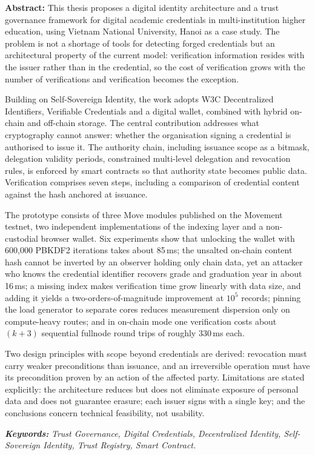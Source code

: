 
{
\textbf{Abstract:} This thesis proposes a digital identity architecture and a trust governance framework for digital academic credentials in multi-institution higher education, using Vietnam National University, Hanoi as a case study. The problem is not a shortage of tools for detecting forged credentials but an architectural property of the current model: verification information resides with the issuer rather than in the credential, so the cost of verification grows with the number of verifications and verification becomes the exception.

Building on Self-Sovereign Identity, the work adopts W3C Decentralized Identifiers, Verifiable Credentials and a digital wallet, combined with hybrid on-chain and off-chain storage. The central contribution addresses what cryptography cannot answer: whether the organisation signing a credential is authorised to issue it. The authority chain, including issuance scope as a bitmask, delegation validity periods, constrained multi-level delegation and revocation rules, is enforced by smart contracts so that authority state becomes public data. Verification comprises seven steps, including a comparison of credential content against the hash anchored at issuance.

The prototype consists of three Move modules published on the Movement testnet, two independent implementations of the indexing layer and a non-custodial browser wallet. Six experiments show that unlocking the wallet with 600,000 PBKDF2 iterations takes about 85\,ms; the unsalted on-chain content hash cannot be inverted by an observer holding only chain data, yet an attacker who knows the credential identifier recovers grade and graduation year in about 16\,ms; a missing index makes verification time grow linearly with data size, and adding it yields a two-orders-of-magnitude improvement at $10^5$ records; pinning the load generator to separate cores reduces measurement dispersion only on compute-heavy routes; and in on-chain mode one verification costs about $(k+3)$ sequential fullnode round trips of roughly 330\,ms each.

Two design principles with scope beyond credentials are derived: revocation must carry weaker preconditions than issuance, and an irreversible operation must have its precondition proven by an action of the affected party. Limitations are stated explicitly: the architecture reduces but does not eliminate exposure of personal data and does not guarantee erasure; each issuer signs with a single key; and the conclusions concern technical feasibility, not usability.

\vspace{0.5cm}
\textit{\textbf{Keywords:}} \textit{Trust Governance, Digital Credentials, Decentralized Identity, Self-Sovereign Identity, Trust Registry, Smart Contract.}
}
